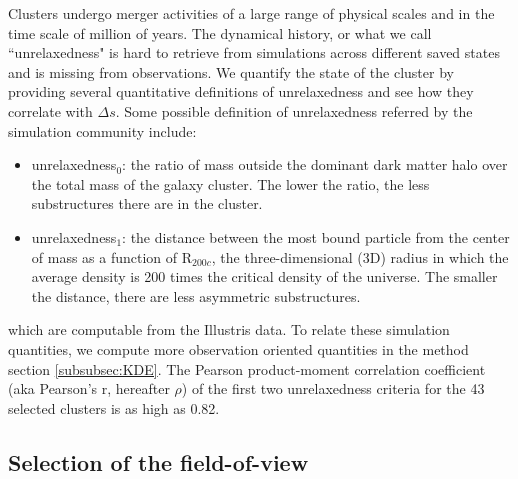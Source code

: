 Clusters undergo merger activities of a large range of physical scales and 
in the time scale of million of years. 
The dynamical history, or what we call ``unrelaxedness" is hard to retrieve from 
simulations across different saved states and is missing from observations.
We quantify the state of the cluster by providing several quantitative
definitions of unrelaxedness and see how they correlate with $\Delta s$.
Some possible definition of unrelaxedness referred by the simulation community
include:
\begin{itemize}
	\item unrelaxedness$_0$: the ratio of mass outside the dominant dark matter halo over the total mass
		of the galaxy cluster. The lower the ratio, the less substructures there
		are in the cluster. 
	\item unrelaxedness$_1$: the distance between the most bound particle from the center of mass as a
		function of R$_{200c}$, the three-dimensional (3D) radius in which the
		average density is 200 times the critical density of the universe. 
		The smaller the distance, there are less asymmetric 
		substructures. 
\end{itemize}
which are computable from the Illustris data. 
To relate these simulation quantities, we compute more observation oriented 
quantities in the method section \ref{subsubsec:KDE}. 
The Pearson product-moment correlation coefficient
(aka Pearson's r,  hereafter $\rho$) of the first
two unrelaxedness criteria for the 43 selected clusters is as high as 0.82. 

\subsection{Selection of the field-of-view}
\label{sec:FOV}


